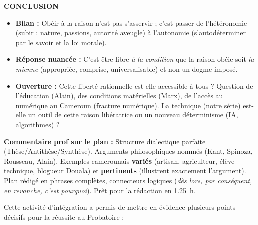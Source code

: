 \documentclass[11pt]{article}
\newcounter{popsec}
\newcounter{popsub}
\newcommand{\courssub}[1]{%
  \stepcounter{popsub}%
  \par\vspace{9pt}\noindent{\popxbold\fontsize{11.5}{13}\selectfont\color{popink}{\color{poporange}\thepopsec.\thepopsub}\hspace{6pt}#1}\par\nopagebreak\vspace{4pt}
}
\begin{document}
\begin{exoresolu}
\textbf{CONCLUSION}
\begin{itemize}
    \item \textbf{Bilan :} Obéir à la raison n'est pas s'asservir ; c'est passer de l'hétéronomie (subir : nature, passions, autorité aveugle) à l'autonomie (s'autodéterminer par le savoir et la loi morale).
    \item \textbf{Réponse nuancée :} C'est être libre \emph{à la condition} que la raison obéie soit \emph{la mienne} (appropriée, comprise, universalisable) et non un dogme imposé.
    \item \textbf{Ouverture :} Cette liberté rationnelle est-elle accessible à tous ? Question de l'éducation (Alain), des conditions matérielles (Marx), de l'accès au numérique au Cameroun (fracture numérique). La technique (notre série) est-elle un outil de cette raison libératrice ou un nouveau déterminisme (IA, algorithmes) ?
\end{itemize}

\textbf{Commentaire prof sur le plan :} Structure dialectique parfaite (Thèse/Antithèse/Synthèse). Arguments philosophiques nommés (Kant, Spinoza, Rousseau, Alain). Exemples camerounais \textbf{variés} (artisan, agriculteur, élève technique, blogueur Douala) et \textbf{pertinents} (illustrent exactement l'argument). Plan rédigé en phrases complètes, connecteurs logiques (\textit{dès lors, par conséquent, en revanche, c'est pourquoi}). Prêt pour la rédaction en \SI{1,25}{h}.

\end{exoresolu}

\courssub{Bilan de l'activité}
Cette activité d'intégration a permis de mettre en évidence plusieurs points décisifs pour la réussite au Probatoire :
\end{document}
